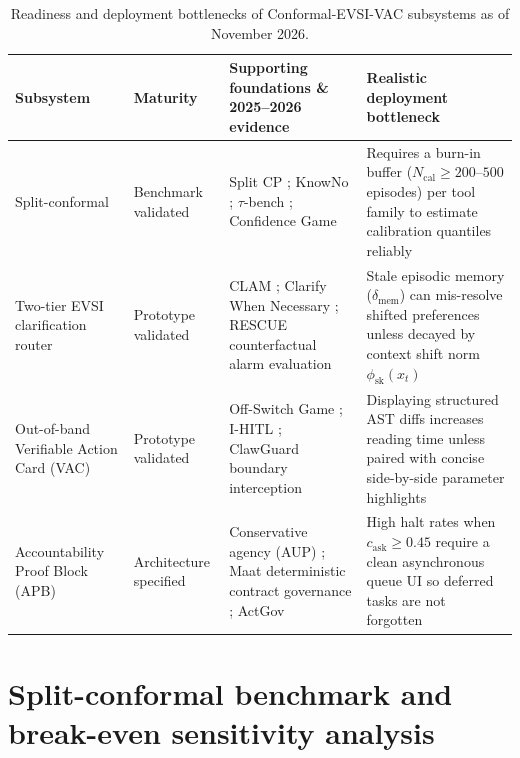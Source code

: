\documentclass[11pt]{article}
\begin{document}
\begin{table}[ht]
\centering
\small
\caption{Readiness and deployment bottlenecks of Conformal-EVSI-VAC subsystems as of November 2026.}
\label{tab:readiness}
\begin{tabularx}{\textwidth}{@{}P{2.3cm}P{2.05cm}YY@{}}
\toprule
Subsystem & Maturity & Supporting foundations \& 2025--2026 evidence & Realistic deployment bottleneck \\
\midrule
Split-conformal & Benchmark validated & Split CP \citep{vovk2005conformal}; KnowNo \citep{ren2023knowno}; $\tau$-bench \citep{yao2024taubench}; Confidence Game \citep{arghal2026confidence} & Requires a burn-in buffer ($N_{\mathrm{cal}} \ge 200$--$500$ episodes) per tool family to estimate calibration quantiles reliably\\
Two-tier EVSI clarification router & Prototype validated & CLAM \citep{kuhn2023clam}; Clarify When Necessary \citep{zhang2024clarify}; RESCUE counterfactual alarm evaluation \citep{armin2026rescue} & Stale episodic memory ($\delta_{\mathrm{mem}}$) can mis-resolve shifted preferences unless decayed by context shift norm $\phi_{\mathrm{sk}}(x_t)$\\
Out-of-band Verifiable Action Card (VAC) & Prototype validated & Off-Switch Game \citep{hadfieldmenell2017offswitch}; I-HITL \citep{breckenridge2026ihitl}; ClawGuard boundary interception \citep{zhao2026clawguard} & Displaying structured AST diffs increases reading time unless paired with concise side-by-side parameter highlights \\
Accountability Proof Block (APB) & Architecture specified & Conservative agency (AUP) \citep{turner2020aup}; Maat deterministic contract governance \citep{elina2026maat}; ActGov \citep{zhang2026actgov} & High halt rates when $c_{\mathrm{ask}} \ge 0.45$ require a clean asynchronous queue UI so deferred tasks are not forgotten\\
\bottomrule\end{tabularx}
\end{table}

\section{Split-conformal benchmark and break-even sensitivity analysis}\label{sec:experiments}
\end{document}
